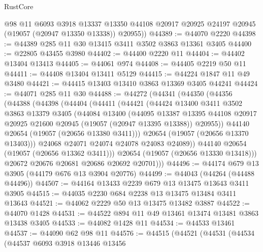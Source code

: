 \begin{lexlean}{RustCore}
\begin{coremodule}
        @98
        @11
        @6093
        @3918
        @13337
        @13350
        @44108
        @20917
        @20925
        @24197
        @20945
        (@19057 (@20947 @13350 @13338))
        @20955))
@44389 := @44070 @2220
@44398 := @44389 @285 @11 @30 @13415 @3411 @3502 @3863 @13361 @3405
@44400 := @22805 @43455 @3980
@44402 := @44400 @2220 @11
@44404 := @44402 @13404 @13413
@44405 := @44061 @974
@44408 := @44405 @2219 @50 @11
@44411 := @44408 @13404 @13411 @5129
@44415 := @44224 @1847 @11 @49 @3480
@44421 := @44415 @13403 @13410 @3863 @13369 @3405 @44241
@44424 := @44071 @285 @11 @30
@44488 := @44272
    (@44341
      (@44350
        (@44356
          (@44388
            (@44398
              (@44404
                (@44411
                  (@44421
                    (@44424
                      @13400
                      @3411
                      @3502
                      @3863
                      @13379
                      @3405
                      (@44084
                        @13400
                        (@44095
                          @13387
                          @13395
                          @44108
                          @20917
                          @20925
                          @21600
                          @20945
                          (@19057 (@20947 @13395 @13388))
                          @20955))
                      @44140
                      @20654
                      (@19057 (@20656 @13380 @3411)))
                    @20654
                    (@19057 (@20656 @13370 @13403)))
                  @24068
                  @24071
                  @24074
                  @24078
                  @24083
                  @24089))
              @44140
              @20654
              (@19057 (@20656 @13362 @3411)))
            @20654
            (@19057 (@20656 @13330 @13418)))
          @20672
          @20676
          @20681
          @20686
          @20692
          @20701)))
@44496 := @44174 @679 @13 @3905 (@44179 @676 @13 @3904 @20776)
@44499 := @44043 (@44264 (@44488 @44496))
@44507 := @44164 @13433 @2239 @679 @13 @13475 @13643 @3411 @3905
@44515 := @44035 @2230 @684 @2238 @13 @13475 @13484 @3411 @13643
@44521 := @44062 @2229 @50 @13 @13475 @13482 @3887
@44522 := @44070 @1428
@44531 := @44522 @894 @11 @49 @13461 @13474 @13481 @3863 @13438 @3405
@44533 := @44082 @1428 @11
@44534 := @44533 @13461
@44537 := @44090 @62 @98 @11
@44576 := @44515
    (@44521
      (@44531
        (@44534
          (@44537
            @6093
            @3918
            @13446
            @13456

\end{coremodule}
\end{lexlean}
